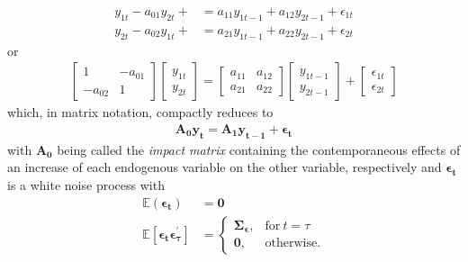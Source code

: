 \documentclass[a4paper,11pt,listof=nochaptergap,oneside,pointednumbers,bibtotoc,bigheadings,liststotoc,hidelinks]{scrbook}
\theoremstyle{mysatz}
\theoremstyle{mydefinition}
\theoremstyle{mytheorem}
\theoremstyle{mybemerkung}
\newcommand{\vect}[1]{\boldsymbol{\mathbf{#1}}}
\begin{document}
\begin{equation} \label{eq:svar2}
\begin{split}
	y_{1t} - a_{01}y_{2t} + & = a_{11}y_{1t-1} + a_{12}y_{2t-1} + \epsilon_{1t} \\
	y_{2t} - a_{02}y_{1t} +  & = a_{21}y_{1t-1} + a_{22}y_{2t-1} + \epsilon_{2t}
\end{split}								
\end{equation}
or 
\begin{equation} \label{eq:svar3}
\begin{split}
	\begin{bmatrix}
    	1 & -a_{01} \\
    	-a_{02} & 1
 	\end{bmatrix}
	\begin{bmatrix}
    	y_{1t} \\
    	y_{2t}
 	\end{bmatrix} = 
	\begin{bmatrix}
    	a_{11} & a_{12} \\
    	a_{21} & a_{22}
 	\end{bmatrix} 
	\begin{bmatrix}
    	y_{1t-1} \\
    	y_{2t-1}
 	\end{bmatrix} +
	\begin{bmatrix}
    	\epsilon_{1t} \\
    	\epsilon_{2t}
 	\end{bmatrix} 
\end{split}								
\end{equation}
which, in matrix notation, compactly reduces to 
\begin{equation} \label{eq:svar4}
\begin{split}
	\vect{A_0 y_t} = \vect{A_1}\vect{y_{t-1}} + \vect{\epsilon_t}
\end{split}								
\end{equation}
with $\vect{A_0}$ being called the \textit{impact matrix} containing the contemporaneous effects of an increase of each endogenous variable on the other variable, respectively and $\vect{\epsilon_t}$ is a white noise process with
\begin{equation}
\begin{split}
	\mathbb{E}(\vect{\epsilon_t}) &  = \vect{0}  \\
	\mathbb{E}[\vect{\epsilon_t}\vect{\epsilon_{\tau}^'}]  & =     \begin{cases}
      												\vect{\Sigma_\epsilon}, & \text{for}\ t = \tau \\
      												\vect{0}, & \text{otherwise.}
   								  \end{cases}
\end{split}								
\end{equation}
\end{document}

